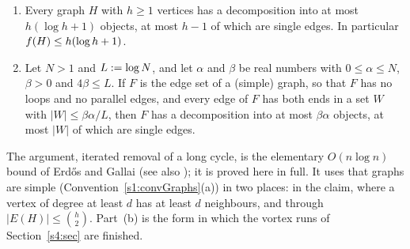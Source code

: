 \begin{fact}\label{s1:factEG0}
\begin{enumerate}
\item[(a)] Every graph $H$ with $h\ge1$ vertices has a decomposition into at
most $h(\log h+1)$ objects, at most $h-1$ of which are single edges. In
particular $f(H)\le h(\log h+1)$.
\item[(b)] Let $N>1$ and $L\mathrel{:=}\log N$, and let $\alpha$ and $\beta$ be real
numbers with $0\le\alpha\le N$, $\beta>0$ and $4\beta\le L$. If $F$ is the
edge set of a (simple) graph, so that $F$ has no loops and no parallel edges,
and every edge of $F$ has both ends in a set $W$ with $|W|\le\beta\alpha/L$,
then $F$ has a decomposition into at most $\beta\alpha$ objects, at most $|W|$
of which are single edges.
\end{enumerate}
The argument, iterated removal of a long cycle, is the elementary
$O(n\log n)$ bound of Erd\H{o}s and Gallai \cite{EG66} (see also
\cite[l.~88--90]{BM}); it is proved here in full. It uses that graphs are
simple (Convention~\ref{s1:convGraphs}(a)) in two places: in the claim, where a
vertex of degree at least $d$ has at least $d$ neighbours, and through
$|E(H)|\le\binom h2$.
Part~(b) is the form in which the vortex runs of Section~\ref{s4:sec} are
finished.
\end{fact}
